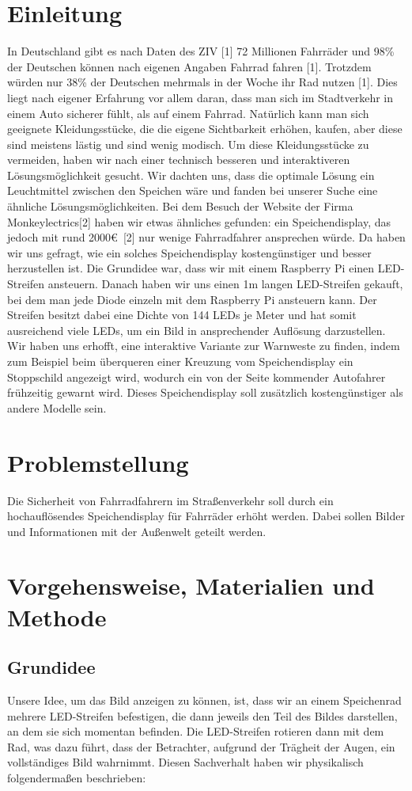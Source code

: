 \documentclass [a4paper, 11pt] {article}
\begin{document}
\tableofcontents
\newpage
\section{Einleitung}
In Deutschland gibt es nach Daten des ZIV [1] 72 Millionen Fahrräder und 98\% der Deutschen können nach eigenen Angaben Fahrrad fahren [1]. Trotzdem würden nur 38\% der Deutschen mehrmals in der Woche ihr Rad nutzen [1]. Dies liegt nach eigener Erfahrung vor allem daran, dass man sich im Stadtverkehr in einem Auto sicherer fühlt, als auf einem Fahrrad. Natürlich kann man sich geeignete Kleidungsstücke, die die eigene Sichtbarkeit erhöhen, kaufen, aber diese sind meistens lästig und sind wenig modisch. Um diese Kleidungsstücke zu vermeiden, haben wir nach einer technisch besseren und interaktiveren Lösungsmöglichkeit gesucht. Wir dachten uns, dass die optimale Lösung ein Leuchtmittel zwischen den Speichen wäre und fanden bei unserer Suche eine ähnliche Lösungsmöglichkeiten. Bei dem Besuch der Website der Firma Monkeylectrics[2] haben wir etwas ähnliches gefunden: ein Speichendisplay, das jedoch mit rund 2000\euro\ [2] nur wenige Fahrradfahrer ansprechen würde. Da haben wir uns gefragt, wie ein solches Speichendisplay kostengünstiger und besser herzustellen ist. Die Grundidee war, dass wir mit einem Raspberry Pi einen LED-Streifen ansteuern. Danach haben wir uns einen 1m langen LED-Streifen gekauft, bei dem man jede Diode einzeln mit dem Raspberry Pi ansteuern kann. Der Streifen besitzt dabei eine Dichte von 144 LEDs je Meter und hat somit ausreichend viele LEDs, um ein Bild in ansprechender Auflösung darzustellen. Wir haben uns erhofft, eine interaktive Variante zur Warnweste zu finden, indem zum Beispiel beim überqueren einer Kreuzung vom Speichendisplay ein Stoppschild angezeigt wird, wodurch ein von der Seite kommender Autofahrer frühzeitig gewarnt wird. Dieses Speichendisplay soll zusätzlich kostengünstiger als andere Modelle sein.
\section{Problemstellung}
Die Sicherheit von Fahrradfahrern im Straßenverkehr soll durch ein hochauflösendes Speichendisplay für Fahrräder erhöht werden. Dabei sollen Bilder und Informationen mit der Außenwelt geteilt werden.
\section{Vorgehensweise, Materialien und Methode}
\subsection{Grundidee}
Unsere Idee, um das Bild anzeigen zu können, ist, dass wir an einem Speichenrad mehrere LED-Streifen befestigen, die dann jeweils den Teil des Bildes darstellen, an dem sie sich momentan befinden. Die LED-Streifen rotieren dann mit dem Rad, was dazu führt, dass der Betrachter, aufgrund der Trägheit der Augen, ein vollständiges Bild wahrnimmt.
Diesen Sachverhalt haben wir physikalisch folgendermaßen beschrieben:
\end{document}
